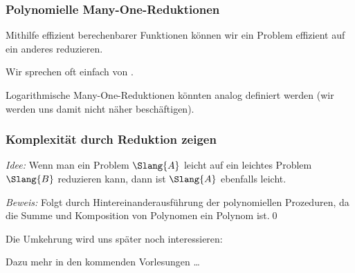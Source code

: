 \documentclass[aspectratio=1610,onlymath]{beamer}
\begin{document}
\begin{frame}\frametitle{Polynomielle Many-One-Reduktionen}

Mithilfe effizient berechenbarer Funktionen können wir ein Problem
effizient auf ein anderes reduzieren.\bigskip

\pause\bigskip

Wir sprechen oft einfach von .
\bigskip

Logarithmische Many-One-Reduktionen könnten analog definiert werden (wir werden uns damit nicht näher beschäftigen).

\end{frame}

\begin{frame}\frametitle{Komplexität durch Reduktion zeigen}

\emph{Idee:} Wenn man ein Problem $\Slang{A}$ leicht auf ein leichtes Problem $\Slang{B}$ reduzieren kann,
dann ist $\Slang{A}$ ebenfalls leicht.\bigskip


\emph{Beweis:} Folgt durch Hintereinanderausführung der polynomiellen Prozeduren, da die Summe und Komposition von Polynomen ein Polynom ist.\qed
\bigskip\pause

Die Umkehrung wird uns später noch interessieren:

\bigskip

Dazu mehr in den kommenden Vorlesungen \ldots

\end{frame}
\end{document}
